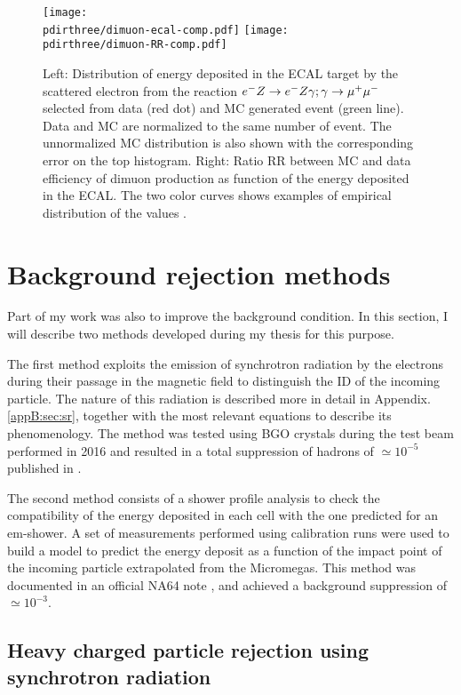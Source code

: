 \begin{figure}[tbh!]
  \centering
  \texttt{[image: \\pdirthree/dimuon-ecal-comp.pdf]}
  \texttt{[image: \\pdirthree/dimuon-RR-comp.pdf]}
  \caption[Dimuon spectra in ECAL for data and MC.]{Left: Distribution of energy deposited in the ECAL target by the scattered electron from the reaction $e^- Z \to e^- Z \gamma; \gamma \to \mu^+ \mu^-$ selected from data (red dot) and MC generated event (green line). Data and MC are normalized to the same number of event. The unnormalized MC distribution is also shown with the corresponding error on the top histogram. Right: Ratio RR between MC and data efficiency of dimuon production as function of the energy deposited in the ECAL. The two color curves shows examples of empirical distribution of the values \cite{na64-prd}.}
  \label{fig:dimuon-comp-invis}
\end{figure}

\section{Background rejection methods}

Part of my work was also to improve the background condition. In this section, I will describe two methods developed during my thesis for this purpose.

The first method exploits the emission of synchrotron radiation by the electrons during their passage in the magnetic field to distinguish the ID of the incoming particle. The nature of this radiation is described more in detail in Appendix.\ref{appB:sec:sr}, together with the most relevant equations to describe its phenomenology. The method was tested using BGO crystals during the test beam performed in 2016 and resulted in a total suppression of hadrons of $\simeq 10^{-5}$ published in \cite{Depero:2017mrr}.

The second method consists of a shower profile analysis to check the compatibility of the energy deposited in each cell with the one predicted for an em-shower. A set of measurements performed using calibration runs were used to build a model to predict the energy deposit as a function of the impact point of the incoming particle extrapolated from the Micromegas.  This method was documented in an official NA64 note \cite{na64-shower-profile}, and achieved a background suppression of $\simeq 10^{-3}$.

\subsection{Heavy charged particle rejection using synchrotron radiation}
\label{ch3:sec:bkg-srd}

